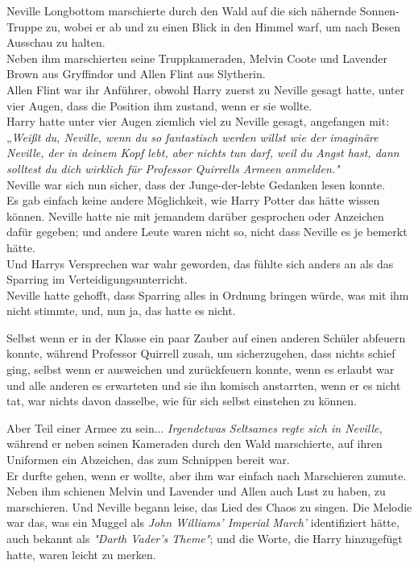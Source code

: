 {Neville Longbottom marschierte durch den Wald auf die sich nähernde Sonnen-Truppe zu, wobei er ab und zu einen Blick in den Himmel warf, um nach Besen Ausschau zu halten.\\ Neben ihm marschierten seine Truppkameraden, Melvin Coote und Lavender Brown aus Gryffindor und Allen Flint aus Slytherin.\\ Allen Flint war ihr Anführer, obwohl Harry zuerst zu Neville gesagt hatte, unter vier Augen, dass die Position ihm zustand, wenn er sie wollte.\\ Harry hatte unter vier Augen ziemlich viel zu Neville gesagt, angefangen mit:\\ „\emph{Weißt du, Neville, wenn du so fantastisch werden willst wie der imaginäre Neville,} \emph{der in deinem Kopf lebt, aber nichts tun darf, weil du Angst hast, dann solltest du dich wirklich für Professor Quirrells Armeen anmelden."}\\ Neville war sich nun sicher, dass der Junge-der-lebte Gedanken lesen konnte.\\ Es gab einfach keine andere Möglichkeit, wie Harry Potter das hätte wissen können. Neville hatte nie mit jemandem darüber gesprochen oder Anzeichen dafür gegeben; und andere Leute waren nicht so, nicht dass Neville es je bemerkt hätte.\\ Und Harrys Versprechen war wahr geworden, das fühlte sich anders an als das Sparring im Verteidigungsunterricht.\\ Neville hatte gehofft, dass Sparring alles in Ordnung bringen würde, was mit ihm nicht stimmte, und, nun ja, das hatte es nicht.

Selbst wenn er in der Klasse ein paar Zauber auf einen anderen Schüler abfeuern konnte, während Professor Quirrell zusah, um sicherzugehen, dass nichts schief ging, selbst wenn er ausweichen und zurückfeuern konnte, wenn es erlaubt war und alle anderen es erwarteten und sie ihn komisch anstarrten, wenn er es nicht tat, war nichts davon dasselbe, wie für sich selbst einstehen zu können.

Aber Teil einer Armee zu sein... \emph{Irgendetwas Seltsames regte sich in Neville,} während er neben seinen Kameraden durch den Wald marschierte, auf ihren Uniformen ein Abzeichen, das zum Schnippen bereit war.\\ Er durfte gehen, wenn er wollte, aber ihm war einfach nach Marschieren zumute. Neben ihm schienen Melvin und Lavender und Allen auch Lust zu haben, zu marschieren. Und Neville begann leise, das Lied des Chaos zu singen. Die Melodie war das, was ein Muggel als \emph{John Williams' Imperial March'} identifiziert hätte, auch bekannt als \emph{"Darth Vader's Theme"}; und die Worte, die Harry hinzugefügt hatte, waren leicht zu merken.

}
